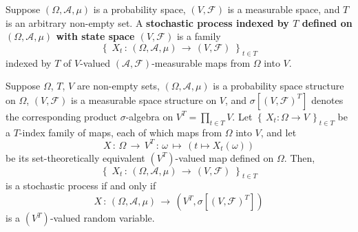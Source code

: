 \begin{definition}
\mbox{}\vskip 0.1cm
\noindent
Suppose $\left(\Omega,\mathcal{A},\mu\right)$ is a probability space,
$\left(V,\mathcal{F}\right)$ is a measurable space, and 
$T$ is an arbitrary non-empty set.
A
\textbf{stochastic process indexed by $T$ defined on $(\Omega,\mathcal{A},\mu)$
with state space $(V,\mathcal{F})$}
is a family
\begin{equation*}
\left\{\;
X_{t} \,:\, \left(\Omega,\mathcal{A},\mu\right)
\,\longrightarrow\,
\left(V,\mathcal{F}\right)
\;\right\}_{t \in T}
\end{equation*}
indexed by $T$ of $V$-valued $\left(\mathcal{A},\mathcal{F}\right)$-measurable
maps from $\Omega$ into $V$.
\end{definition}

\begin{corollary}
\mbox{}\vskip 0.1cm
\noindent
Suppose $\Omega$, $T$, $V$ are non-empty sets,
$\left(\Omega,\mathcal{A},\mu\right)$ is a probability space structure on $\Omega$,
$\left(V,\mathcal{F}\right)$ is a measurable space structure on $V$, and
$\sigma[(V,\mathcal{F})^{T}]$ denotes the corresponding product $\sigma$-algebra
on $V^{T} = \prod_{t\in T}V$.
Let $\left\{\,X_{t} : \Omega \longrightarrow V \,\right\}_{t \in T}$
be a $T$-index family of maps, each of which maps from $\Omega$ into $V$,
and let
\begin{equation*}
X \,:\, \Omega \,\longrightarrow\, V^{T} \,:\, \omega \,\longmapsto\, \left(t \longmapsto X_{t}(\omega)\right)
\end{equation*}
be its set-theoretically equivalent $(V^{T})$-valued map defined on $\Omega$.
Then,
\begin{equation*}
\left\{\; X_{t} \,:\, \left(\Omega,\mathcal{A},\mu\right)\,\longrightarrow\,\left(V,\mathcal{F}\right) \;\right\}_{t \in T}
\end{equation*}
is a stochastic process if and only if
\begin{equation*}
X \,:\, \left(\Omega,\mathcal{A},\mu\right)\,\longrightarrow\,\left(V^{T},\sigma[(V,\mathcal{F})^{T}]\right)
\end{equation*}
is a $(V^{T})$-valued random variable.
\end{corollary}

